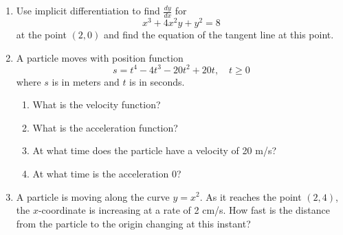 \documentclass[12pt]{article}
\begin{document}
\begin{enumerate}
\item Use implicit differentiation to find $\frac{dy}{dx}$ for $$x^3 + 4x^2y + y^2 = 8$$ at the point $(2,0)$ and find the equation of the tangent line at this point.
\clearpage

\item A particle moves with position function $$s = t^4-4t^3-20t^2+20t, \quad t\geq 0$$
where $s$ is in meters and $t$ is in seconds.
\begin{enumerate}
\item What is the velocity function?
\vspace{1in}
\item What is the acceleration function?
\vspace{1in}
\item At what time does the particle have a velocity of 20 m/s?
\vspace{2in}
\item At what time is the acceleration 0? 
\end{enumerate}

\pagebreak

\item A particle is moving along the curve $y = x^2$. As it reaches the point $(2,4)$, the $x$-coordinate is increasing at a rate of 2 cm/s. How fast is the distance from the particle to the origin changing at this instant?

\pagebreak
\end{enumerate}
\end{document}
